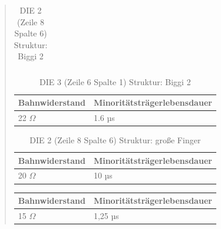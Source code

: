 \begin{quote}
\begin{table}[H]
\begin{addmargin}[3cm]{3cm}
\begin{tabular}{|p{5cm}|p{5cm}|}
                    \end{tabular}
              \end{addmargin}
              \caption{DIE 2 (Zeile 8 Spalte 6) Struktur: Biggi 2}
              \label{tab:bahnMinbigmitt}
            \end{table}

     \vspace{2em}


            \begin{table}[H]
              \begin{addmargin}[3cm]{3cm}
                \centering
                   \begin{tabular}{|p{5cm}|p{5cm}|}
                    \hline
                    Bahnwiderstand &  Minoritätsträgerlebensdauer\\
                    \hline
                    22 $\Omega$ & 1.6 µs \\
                    \hline

                    \end{tabular}
              \end{addmargin}
              \caption{DIE 3 (Zeile 6 Spalte 1) Struktur: Biggi 2}
              \label{tab:bahnMinbigauss}
            \end{table}

     \vspace{2em}

            \begin{table}[H]
              \begin{addmargin}[3cm]{3cm}
                \centering
                   \begin{tabular}{|p{5cm}|p{5cm}|}
                    \hline
                    Bahnwiderstand &  Minoritätsträgerlebensdauer\\
                    \hline
                    20 $\Omega$ & 10 µs \\
                    \hline

                    \end{tabular}
              \end{addmargin}
              \caption{DIE 2 (Zeile 8 Spalte 6) Struktur: große Finger}
              \label{tab:bahnMinfingmitt}
            \end{table}

     \vspace{2em}

            \begin{table}[H]
              \begin{addmargin}[3cm]{3cm}
                \centering
                   \begin{tabular}{|p{5cm}|p{5cm}|}
                    \hline
                    Bahnwiderstand &  Minoritätsträgerlebensdauer\\
                    \hline
                    15  $\Omega$ & 1,25 µs \\
                    \hline


\end{tabular}
\end{addmargin}
\end{table}
\end{quote}
